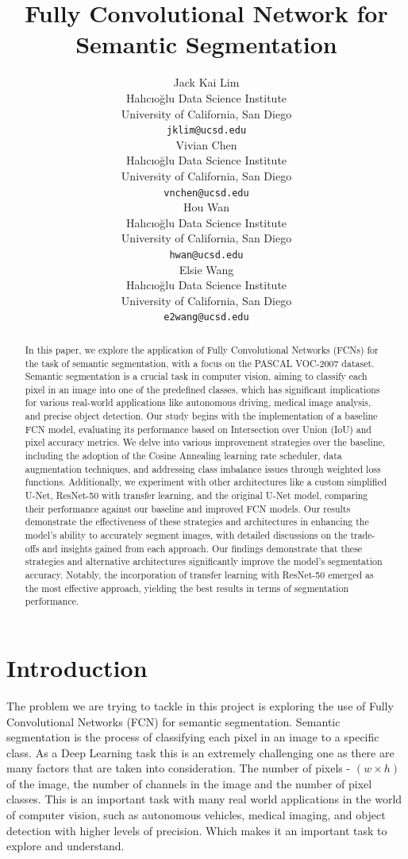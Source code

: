 \documentclass{article}
\title{Fully Convolutional Network for Semantic Segmentation}
\author{
  Jack Kai Lim\\
  Halıcıoğlu Data Science Institute\\
  University of California, San Diego\\
  \texttt{jklim@ucsd.edu}\\
  \And
  Vivian Chen\\
  Halıcıoğlu Data Science Institute\\
  University of California, San Diego\\
  \texttt{vnchen@ucsd.edu}\\
  \And
  Hou Wan\\
  Halıcıoğlu Data Science Institute\\
  University of California, San Diego\\
  \texttt{hwan@ucsd.edu}\\
  \And
  Elsie Wang\\
  Halıcıoğlu Data Science Institute\\
  University of California, San Diego\\
  \texttt{e2wang@ucsd.edu}
}
\begin{document}
\maketitle


\begin{abstract}
  In this paper, we explore the application of Fully Convolutional Networks (FCNs) for the task of semantic segmentation, with a focus on the PASCAL VOC-2007 dataset. Semantic segmentation is a crucial task in computer vision, aiming to classify each pixel in an image into one of the predefined classes, which has significant implications for various real-world applications like autonomous driving, medical image analysis, and precise object detection. Our study begins with the implementation of a baseline FCN model, evaluating its performance based on Intersection over Union (IoU) and pixel accuracy metrics. We delve into various improvement strategies over the baseline, including the adoption of the Cosine Annealing learning rate scheduler, data augmentation techniques, and addressing class imbalance issues through weighted loss functions. Additionally, we experiment with other architectures like a custom simplified U-Net, ResNet-50 with transfer learning, and the original U-Net model, comparing their performance against our baseline and improved FCN models. Our results demonstrate the effectiveness of these strategies and architectures in enhancing the model's ability to accurately segment images, with detailed discussions on the trade-offs and insights gained from each approach. Our findings demonstrate that these strategies and alternative architectures significantly improve the model's segmentation accuracy. Notably, the incorporation of transfer learning with ResNet-50 emerged as the most effective approach, yielding the best results in terms of segmentation performance.
\end{abstract}


\section{Introduction}
The problem we are trying to tackle in this project is exploring the use of Fully Convolutional Networks (FCN) for semantic segmentation. Semantic segmentation is the process of classifying each pixel in an image to a specific class. As a Deep Learning task this is an extremely challenging one as there are many factors that are taken into consideration. The number of pixels - $(w \times h)$ of the image, the number of channels in the image and the number of pixel classes. This is an important task with many real world applications in the world of computer vision, such as autonomous vehicles, medical imaging, and object detection with higher levels of precision. Which makes it an important task to explore and understand.
\end{document}
